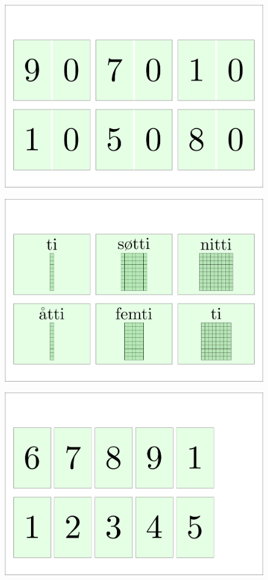 \begin{figure}
	\centering
	\includegraphics[scale=0.999]{70to90a}
\end{figure}

\begin{figure}
	\centering
	\includegraphics[scale=0.999]{70to90b}
\end{figure}

\begin{figure}
	\centering
	\includegraphics[scale=0.999]{1to9a}
\end{figure}


